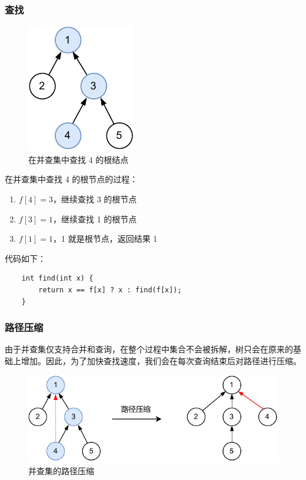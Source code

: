 \documentclass[12pt,a4paper]{article}
\begin{document}
\subsubsection{查找}

\begin{figure}[h]
    \centering
    \includegraphics{img/lab6/并查集_get.pdf}
    \caption{在并查集中查找 4 的根结点}
    \label{fig:uf_get}
\end{figure}

在并查集中查找 4 的根节点的过程：

\begin{enumerate}[itemsep=2pt,topsep=0pt,parsep=0pt]
    \item $f[4] = 3$，继续查找 3 的根节点
    \item $f[3] = 1$，继续查找 1 的根节点
    \item $f[1] = 1$，1 就是根节点，返回结果 1
\end{enumerate}

代码如下：
\begin{lstlisting}
    int find(int x) {
        return x == f[x] ? x : find(f[x]);
    }
\end{lstlisting}

\subsubsection{路径压缩}

由于并查集仅支持合并和查询，在整个过程中集合不会被拆解，树只会在原来的基础上增加。因此，为了加快查找速度，我们会在每次查询结束后对路径进行压缩。

\begin{figure}[h]
    \centering
    \includegraphics{img/lab6/并查集_路径压缩.drawio.pdf}
    \caption{并查集的路径压缩}
    \label{fig:uf_cmpression}
\end{figure}
\end{document}
